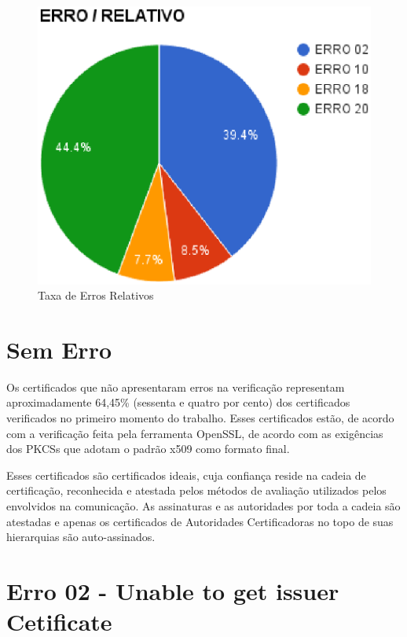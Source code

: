 	\begin{figure}[h]
		\centering
		\includegraphics[keepaspectratio=true,scale=1]{figuras/erRel.eps}
		\caption{Taxa de Erros Relativos}
		\label{fig:graph02}
	\end{figure}

\section[Sem Erro]{Sem Erro}

	Os certificados que não apresentaram erros na verificação representam aproximadamente 64,45\% (sessenta e quatro por cento) dos certificados verificados no primeiro momento do trabalho. Esses certificados estão, de acordo com a verificação feita pela ferramenta OpenSSL, de acordo com as exigências dos PKCSs que adotam o padrão x509 como formato final.
	
	Esses certificados são certificados ideais, cuja confiança reside na cadeia de certificação, reconhecida e atestada pelos métodos de avaliação utilizados pelos envolvidos na comunicação. As assinaturas e as autoridades por toda a cadeia são atestadas e apenas os certificados de Autoridades Certificadoras no topo de suas hierarquias são auto-assinados.

\section[Erro 02 - Unable to get issuer Cetificate]{Erro 02 - Unable to get issuer Cetificate}

